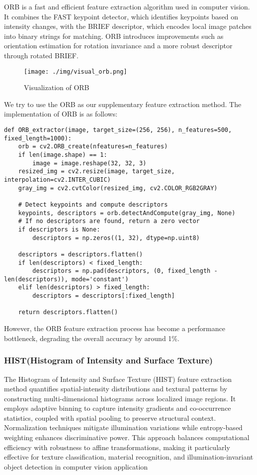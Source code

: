 \documentclass[a4paper,11pt]{article}
\begin{document}
ORB is a fast and efficient feature extraction algorithm used in computer vision. It combines the FAST keypoint detector, which identifies keypoints based on intensity changes, with the BRIEF descriptor, which encodes local image patches into binary strings for matching. ORB introduces improvements such as orientation estimation for rotation invariance and a more robust descriptor through rotated BRIEF.

\begin{figure}[H]
    \centering
    \texttt{[image: ./img/visual\_orb.png]}
    \caption[visual_hog] {Visualization of ORB}
\end{figure}

We try to use the ORB as our supplementary feature extraction method. The implementation of ORB is as follows:

\begin{verbatim}
def ORB_extractor(image, target_size=(256, 256), n_features=500, fixed_length=1000):
    orb = cv2.ORB_create(nfeatures=n_features)
    if len(image.shape) == 1:
        image = image.reshape(32, 32, 3)
    resized_img = cv2.resize(image, target_size, interpolation=cv2.INTER_CUBIC)
    gray_img = cv2.cvtColor(resized_img, cv2.COLOR_RGB2GRAY)

    # Detect keypoints and compute descriptors
    keypoints, descriptors = orb.detectAndCompute(gray_img, None)
    # If no descriptors are found, return a zero vector
    if descriptors is None:
        descriptors = np.zeros((1, 32), dtype=np.uint8)

    descriptors = descriptors.flatten()
    if len(descriptors) < fixed_length:
        descriptors = np.pad(descriptors, (0, fixed_length - len(descriptors)), mode='constant')
    elif len(descriptors) > fixed_length:
        descriptors = descriptors[:fixed_length]

    return descriptors.flatten()
\end{verbatim}

However, the ORB feature extraction process has become a performance bottleneck, degrading the overall accuracy by around 1\%.

\subsubsection{HIST(Histogram of Intensity and Surface Texture)}

The Histogram of Intensity and Surface Texture (HIST) feature extraction method quantifies spatial-intensity distributions and textural patterns by constructing multi-dimensional histograms across localized image regions. It employs adaptive binning to capture intensity gradients and co-occurrence statistics, coupled with spatial pooling to preserve structural context. Normalization techniques mitigate illumination variations while entropy-based weighting enhances discriminative power. This approach balances computational efficiency with robustness to affine transformations, making it particularly effective for texture classification, material recognition, and illumination-invariant object detection in computer vision application
\end{document}
